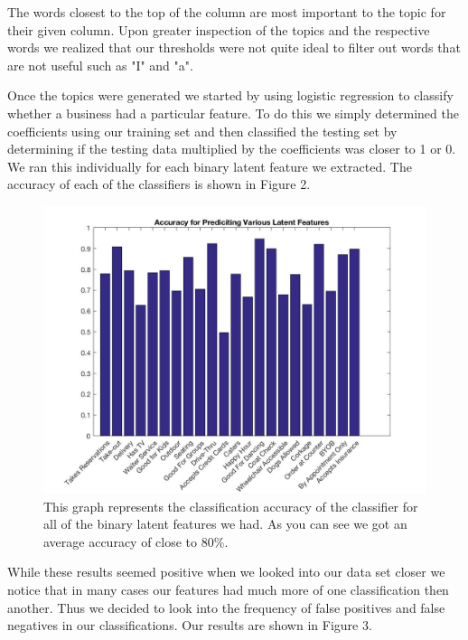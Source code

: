 \documentclass{article}
\begin{document}
The words closest to the top of the column are most important to the topic for their given column.  Upon greater inspection of the topics and the respective words we realized that our thresholds were not quite ideal to filter out words that are not useful such as "I" and "a".

Once the topics were generated we started by using logistic regression to classify whether a business had a particular feature. To do this we simply determined the coefficients using our training set and then classified the testing set by determining if the testing data multiplied by the coefficients was closer to 1 or 0. We ran this individually for each binary latent feature we extracted. The accuracy of each of the classifiers is shown in Figure 2.

\begin{figure}[!h]
\centering
\includegraphics[scale = .3]{fpAccuracy}
\caption{This graph represents the classification accuracy of the classifier for all of the binary latent features we had. As you can see we got an average accuracy of close to 80\%.}
\end{figure}

While these results seemed positive when we looked into our data set closer we notice that in many cases our features had much more of one classification then another. Thus we decided to look into the frequency of false positives and false negatives in our classifications. Our results are shown in Figure 3.
\end{document}
